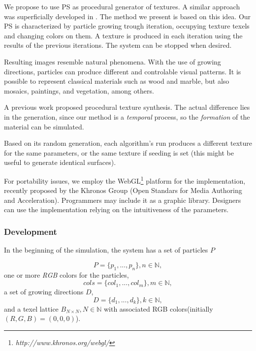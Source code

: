 We propose to use PS as procedural generator of textures.
A similar approach was superficially developed in \cite{Kranidotis98}.
The method we present is based on this idea.
Our PS is characterized by particle growing trough iteration, occupying texture texels and changing colors on them.
A texture is produced in each iteration using the results of the previous iterations. The system can be stopped when desired.

Resulting images resemble natural phenomena.
With the use of growing directions, particles can produce different and controlable visual patterns.
It is possible to represent classical materials such as wood and marble, but also mosaics, paintings, and vegetation, among others.

A previous work \cite{Baravalle2010} proposed procedural texture synthesis.
The actual difference lies in the generation, since our method is a {\em temporal} process, so the {\em formation} of the material can be simulated.

Based on its random generation, each algorithm's run produces a different texture for the same parameters, or the same texture if seeding is set (this might be useful to generate identical surfaces).

For portability issues, we employ the WebGL\footnote{\em http://www.khronos.org/webgl/} platform for the implementation, recently proposed by the Khronos Group (Open Standars for Media Authoring and Acceleration).
Programmers may include it as a graphic library.
Designers can use the implementation relying on the intuitiveness of the parameters.


\subsubsection{Development}

In the beginning of the simulation, the system has a set of particles $P$

\begin{equation}
P = \{p_{1}, ... , p_{n}\}, n  \in \mathbb{N},
\end{equation}
one or more {\em RGB} colors for the particles,
\begin{equation}
cols = \{col_{1}, ... , col_{m} \}, m \in \mathbb{N},
\end{equation}
a set of growing directions $D$,
\begin{equation}
D = \{d_{1}, ... , d_{k} \}, k \in \mathbb{N},
\end{equation}
and a texel lattice $B_{N\times N}, N \in \mathbb{N} $ with associated RGB colors(initially $(R,G,B)=(0,0,0)$).

